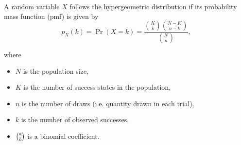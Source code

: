 \documentclass[a4paper,12pt]{article}
\begin{document}
\begin{framed}
A random variable 
$ {\displaystyle X} $
 follows the hypergeometric distribution if its probability mass function (pmf) is given by
\[ {\displaystyle p_{X}(k)=\Pr(X=k)={\frac {{\binom {K}{k}}{\binom {N-K}{n-k}}}{\binom {N}{n}}},} \]

where 
\begin{itemize}
\item ${\displaystyle N}$ 
 is the population size,
\item ${\displaystyle K}$ 
 is the number of success states in the population,
\item ${\displaystyle n}$ 
 is the number of draws (i.e. quantity drawn in each trial),
\item ${\displaystyle k}$ 
 is the number of observed successes,
\item ${\textstyle \textstyle {a \choose b}}$ 
 is a binomial coefficient.
\end{itemize}

\end{framed}
\end{document}
